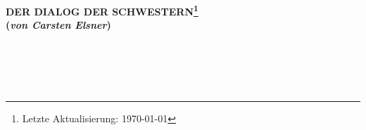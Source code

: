 
\begin{center}
\bf DER DIALOG DER SCHWESTERN\footnote{Letzte Aktualisierung: \today}
\[\]
({\em von Carsten Elsner\/})
\end{center}
\[\]

\[\]

\[\] %

\newpage %

\[\] %

\[\]

\[\]


